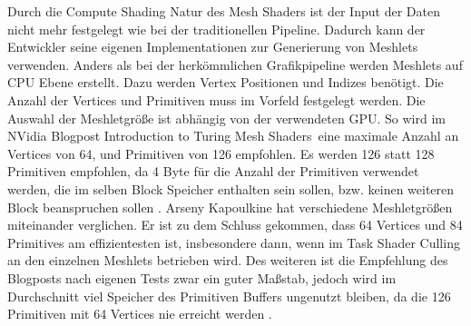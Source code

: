 Durch die Compute Shading Natur des Mesh Shaders ist der Input der Daten nicht mehr festgelegt wie bei der traditionellen Pipeline.
Dadurch kann der Entwickler seine eigenen Implementationen zur Generierung von Meshlets verwenden.
Anders als bei der herkömmlichen Grafikpipeline werden Meshlets auf CPU Ebene erstellt.
Dazu werden Vertex Positionen und Indizes benötigt.
Die Anzahl der Vertices und Primitiven muss im Vorfeld festgelegt werden.
Die Auswahl der Meshletgröße ist abhängig von der verwendeten GPU.
So wird im NVidia Blogpost \glqq Introduction to Turing Mesh Shaders\grqq\ eine maximale Anzahl an Vertices von 64, und Primitiven von 126 empfohlen. 
Es werden 126 statt 128 Primitiven empfohlen, da 4 Byte für die Anzahl der Primitiven verwendet werden, die im selben Block Speicher enthalten sein sollen, bzw. keinen weiteren Block beanspruchen sollen \cite{Kubisch2018}.
Arseny Kapoulkine hat verschiedene Meshletgrößen miteinander verglichen.
Er ist zu dem Schluss gekommen, dass 64 Vertices und 84 Primitives am effizientesten ist, insbesondere dann, wenn im Task Shader Culling an den einzelnen Meshlets betrieben wird.
Des weiteren ist die Empfehlung des Blogposts nach eigenen Tests zwar ein guter Maßstab, jedoch wird im Durchschnitt viel Speicher des Primitiven Buffers ungenutzt bleiben, da die 126 Primitiven mit 64 Vertices nie erreicht werden \cite{Kapoulkine2023}.

